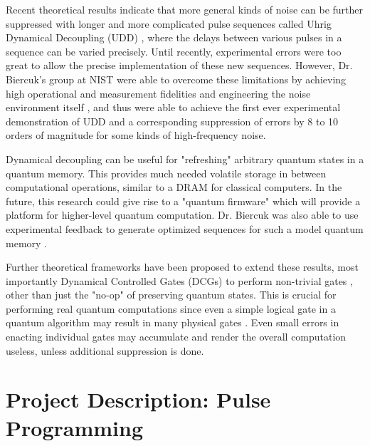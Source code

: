 \documentclass{article}
\begin{document}
Recent theoretical results indicate that more general kinds of noise can be further
suppressed with longer and more complicated pulse sequences called
Uhrig Dynamical Decoupling (UDD) \cite{Uhrig2007}, where the delays between various
pulses in a sequence can be varied precisely.
Until recently, experimental errors were too great to allow the precise
implementation of these new sequences. However, Dr. Biercuk's group at NIST
were able to overcome these limitations by achieving high operational
and measurement fidelities and engineering the noise
environment itself \cite{BUVSIB2009a}, and thus were able to achieve
the first ever experimental demonstration of UDD and a corresponding
suppression of errors by 8 to 10 orders of magnitude for some kinds of
high-frequency noise.

Dynamical decoupling can be useful for "refreshing" arbitrary quantum states
in a quantum memory. This provides much needed volatile storage in between
computational operations, similar to a DRAM for classical computers. In the
future, this research could give rise to a "quantum firmware" which will
provide a platform for higher-level quantum computation.
Dr. Biercuk was also able to use experimental feedback to
generate optimized sequences for such a model quantum memory \cite{BUVSIB2009c}.

Further theoretical frameworks have been proposed to extend these results,
most importantly Dynamical Controlled Gates (DCGs) to perform non-trivial gates
\cite{Khodjasteh2009},
other than just the "no-op" of preserving quantum states.
This is crucial for performing real quantum computations since even a simple
logical gate in a quantum algorithm may result in many physical gates
\cite{Dawson2005}.
Even small errors in enacting individual gates may accumulate and render
the overall computation useless, unless additional suppression is done.

\section{Project Description: Pulse Programming}
\end{document}
